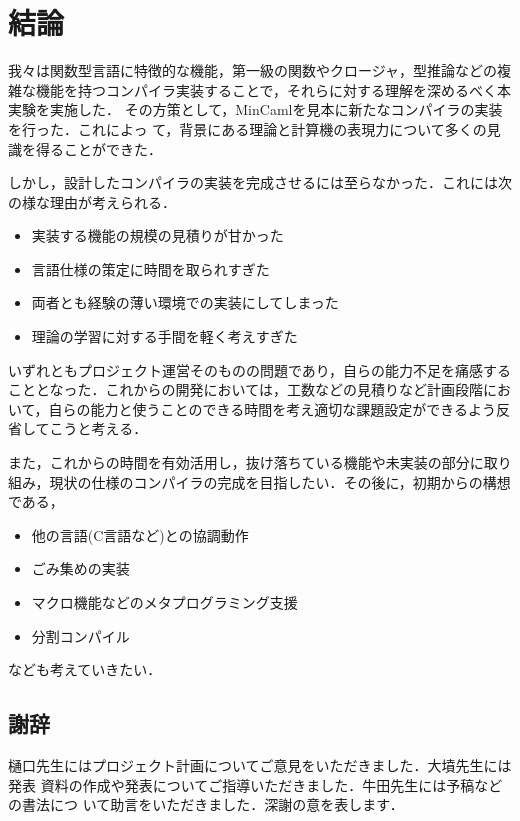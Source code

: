 \documentclass[a4paper,titlepage,report,disablejfam]{jsbook}
\begin{document}
\chapter{結論}\label{ch:conclude}
我々は関数型言語に特徴的な機能，第一級の関数やクロージャ，型推論などの複
雑な機能を持つコンパイラ実装することで，それらに対する理解を深めるべく本
実験を実施した．
その方策として，MinCamlを見本に新たなコンパイラの実装を行った．これによっ
て，背景にある理論と計算機の表現力について多くの見識を得ることができた．

しかし，設計したコンパイラの実装を完成させるには至らなかった．これには次
の様な理由が考えられる．
\begin{itemize}
 \item 実装する機能の規模の見積りが甘かった
 \item 言語仕様の策定に時間を取られすぎた
 \item 両者とも経験の薄い環境での実装にしてしまった
 \item 理論の学習に対する手間を軽く考えすぎた
\end{itemize}

いずれともプロジェクト運営そのものの問題であり，自らの能力不足を痛感する
こととなった．これからの開発においては，工数などの見積りなど計画段階にお
いて，自らの能力と使うことのできる時間を考え適切な課題設定ができるよう反
省してこうと考える．

また，これからの時間を有効活用し，抜け落ちている機能や未実装の部分に取り
組み，現状の仕様のコンパイラの完成を目指したい．その後に，初期からの構想
である，
\begin{itemize}
 \item 他の言語(C言語など)との協調動作
 \item ごみ集めの実装
 \item マクロ機能などのメタプログラミング支援
 \item 分割コンパイル
\end{itemize}
なども考えていきたい．
\begin{flushright}[文責: 小堀 育男]\end{flushright}

\section*{謝辞}
樋口先生にはプロジェクト計画についてご意見をいただきました．大墳先生には発表
資料の作成や発表についてご指導いただきました．牛田先生には予稿などの書法につ
いて助言をいただきました．深謝の意を表します．




\backmatter
\appendix
\end{document}
